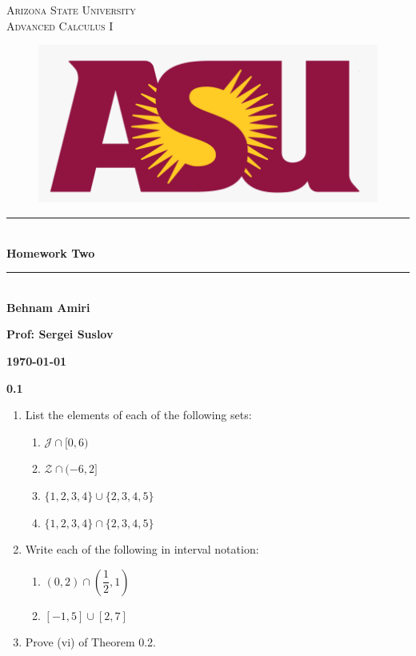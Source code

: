 \documentclass[fleqn]{article}
\begin{document}
  \begin{titlepage}

    \newcommand{\HRule}{\rule{\linewidth}{0.5mm}}

    \center


    \textsc{\LARGE Arizona State University}\\[1.5cm]

    \textsc{\LARGE Advanced Calculus I }\\[1.5cm]


    \begin{figure}
      \includegraphics[width=\linewidth]{asu.png}
    \end{figure}


    \HRule \\[0.4cm]
    { \huge \bfseries Homework Two }\\[0.4cm] 
    \HRule \\[1.5cm]

    \textbf{Behnam Amiri}

    \bigbreak

    \textbf{Prof: Sergei Suslov}

    \bigbreak


    \textbf{{\large \today}\\[2cm]}

    \vfill

  \end{titlepage}

  \textbf{0.1}
  \begin{enumerate}
    \item List the elements of each of the following sets:
    \begin{enumerate}
      \item $\mathcal{J} \cap [0,6)$
      \item $\mathcal{Z} \cap (-6, 2]$
      \item $\{ 1, 2, 3, 4 \}  \cup \{ 2, 3, 4, 5\}$
      \item $\{ 1, 2, 3, 4 \}  \cap \{ 2, 3, 4, 5\}$
    \end{enumerate}

    \item Write each of the following in interval notation:
    \begin{enumerate}
      \item $(0, 2) \cap (\dfrac{1}{2}, 1)$
      \item $[-1, 5] \cup [2, 7]$
    \end{enumerate}

    \item Prove (vi) of Theorem 0.2.
  \end{enumerate}
\end{document}
